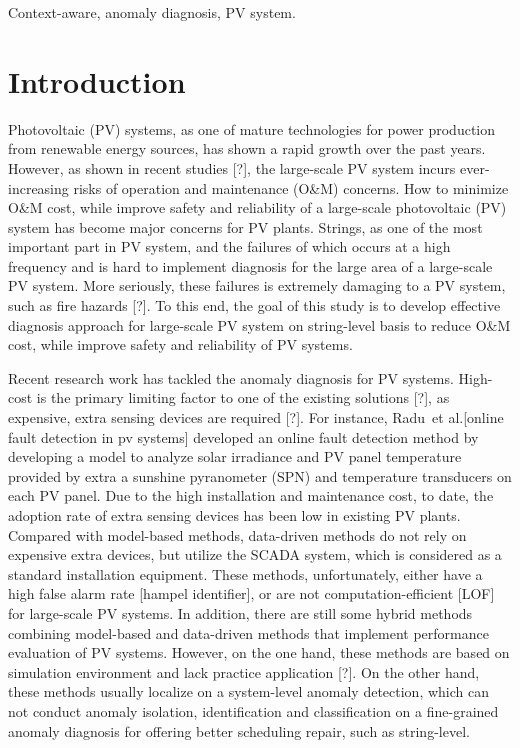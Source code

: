 \documentclass[journal]{IEEEtran}
\makeatletter
\newcommand{\etal}{et al.\@\xspace}
\makeatother
\begin{document}
\begin{keywords}
Context-aware, anomaly diagnosis, PV system.
\end{keywords}


\section{Introduction}
\label{sect::intro}
Photovoltaic (PV) systems, as one of mature technologies for power production from renewable energy sources, has shown a rapid growth over the past years. However, as shown in recent studies [?], the large-scale PV system incurs ever-increasing risks of operation and maintenance (O\&M) concerns. How to minimize O\&M cost, while improve safety and reliability of a large-scale photovoltaic (PV) system has become major concerns for PV plants. Strings, as one of the most important part in PV system, and the failures of which occurs at a high frequency and is hard to implement diagnosis for the large area of a large-scale PV system. More seriously, these failures is extremely damaging to a PV system, such as fire hazards [?]. To this end, the goal of this study is to develop effective diagnosis approach for large-scale PV system on string-level basis to reduce O\&M cost, while improve safety and reliability of PV systems. 

Recent research work has tackled the anomaly diagnosis for PV systems. High-cost is the primary limiting factor to one of the existing solutions [?], as expensive, extra sensing devices are required [?]. For instance, Radu~\etal [online fault detection in pv systems] developed an online fault detection method by developing a model to analyze solar irradiance and PV panel temperature provided by extra a sunshine pyranometer (SPN) and temperature transducers on each PV panel. Due to the high installation and maintenance cost, to date, the adoption rate of extra sensing devices has been low in existing PV plants. Compared with model-based methods, data-driven methods do not rely on expensive extra devices, but utilize the SCADA system, which is considered as a standard installation equipment. These methods, unfortunately, either have a high false alarm rate [hampel identifier], or are not computation-efficient [LOF] for large-scale PV systems. In addition, there are still some hybrid methods combining model-based and data-driven methods that implement performance evaluation of PV systems. However, on the one hand, these methods are based on simulation environment and lack practice application [?]. On the other hand, these methods usually localize on a system-level anomaly detection, which can not conduct anomaly isolation, identification and classification on a fine-grained anomaly diagnosis for offering better scheduling repair, such as string-level. 
\end{document}

